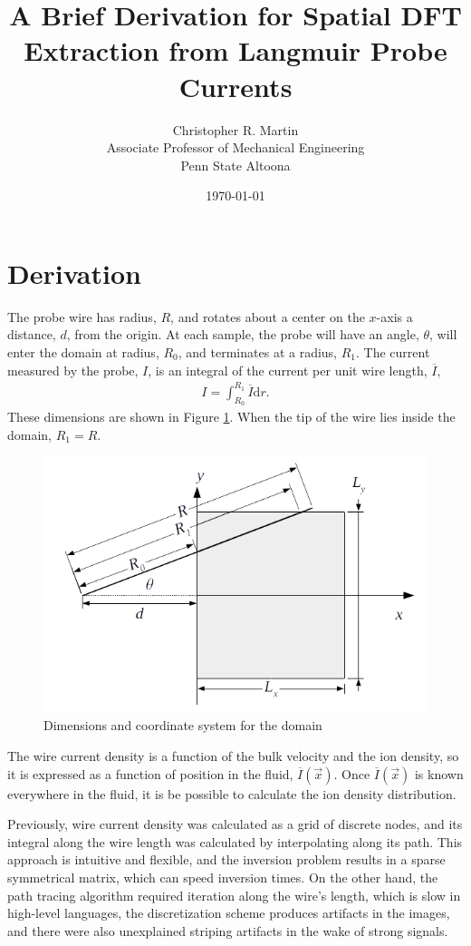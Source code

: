 \documentclass{article}
\title{A Brief Derivation for Spatial DFT Extraction from Langmuir Probe Currents}
\author{Christopher R. Martin\\Associate Professor of Mechanical Engineering\\Penn State Altoona}
\date{\today}
\def\I{\overline{I}}
\def\d{\mathrm{d}}
\def\x{\vec{x}}
\begin{document}
\maketitle

\section{Derivation}

The probe wire has radius, $R$, and rotates about a center on the $x$-axis a distance, $d$, from the origin.  At each sample, the probe will have an angle, $\theta$, will enter the domain at radius, $R_0$, and terminates at a radius, $R_1$.  The current measured by the probe, $I$, is an integral of the current per unit wire length, $\I$,
\begin{align}
I = \int_{R_0}^{R_1} \I \d r.
\end{align}
These dimensions are shown in Figure \ref{fig:coords}.  When the tip of the wire lies inside the domain, $R_1 = R$.

\begin{figure}
\centering
\includegraphics[width=.9\linewidth]{figures/coords}
\caption{Dimensions and coordinate system for the domain}\label{fig:coords}
\end{figure}

The wire current density is a function of the bulk velocity and the ion density, so it is expressed as a function of position in the fluid, $\I(\x)$.  Once $\I(\x)$ is known everywhere in the fluid, it is be possible to calculate the ion density distribution.  

Previously, wire current density was calculated as a grid of discrete nodes, and its integral along the wire length was calculated by interpolating along its path.  This approach is intuitive and flexible, and the inversion problem results in a sparse symmetrical matrix, which can speed inversion times.  On the other hand, the path tracing algorithm required iteration along the wire's length, which is slow in high-level languages, the discretization scheme produces artifacts in the images, and there were also unexplained striping artifacts in the wake of strong signals.
\end{document}
